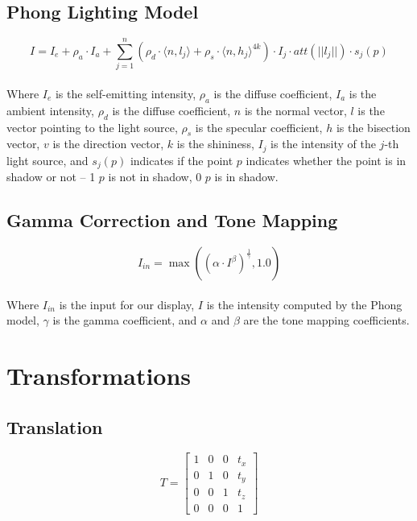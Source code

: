 \documentclass{article}
\begin{document}
\subsection{Phong Lighting Model}
\vspace{.3cm}
\[ I = I_e + \rho_a \cdot I_a + \sum^n_{j = 1} (\rho_d \cdot \langle n, l_j \rangle + \rho_s \cdot \langle n, h_j \rangle^{4k}) \cdot I_j \cdot att(||l_j||) \cdot s_j(p) \] \\
Where $I_e$ is the self-emitting intensity, $\rho_a$ is the diffuse coefficient, $I_a$ is the ambient intensity, $\rho_d$ is the diffuse coefficient, $n$ is the normal vector, $l$ is the vector pointing to the light source, $\rho_s$ is the specular coefficient, $h$ is the bisection vector, $v$ is the direction vector, $k$ is the shininess, $I_j$ is the intensity of the $j$-th light source, and $s_j(p)$ indicates if the point $p$ indicates whether the point is in shadow or not -- 1 $p$ is not in shadow, 0 $p$ is in shadow.

\subsection{Gamma Correction and Tone Mapping}
\vspace{.3cm}
\[ I_{in} = \max((\alpha \cdot I^\beta)^{\frac{1}{\gamma}}, 1.0) \] \\
Where $I_{in}$ is the input for our display, $I$ is the intensity computed by the Phong model, $\gamma$ is the gamma coefficient, and $\alpha$ and $\beta$ are the tone mapping coefficients.

\section{Transformations}
\subsection{Translation}
\vspace{.3cm}
\[ T = \begin{bmatrix} 1 & 0 & 0 & t_x \\ 0 & 1 & 0 & t_y \\ 0 & 0 & 1 & t_z \\ 0 & 0 & 0 & 1 \end{bmatrix} \]
\end{document}
